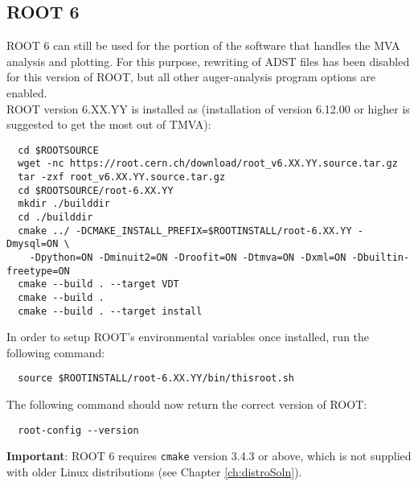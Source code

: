 \documentclass[12pt,a4paper]{report}
\begin{document}
\subsection{ROOT 6}
ROOT 6 can still be used for the portion of the software that handles the MVA analysis and plotting. For this purpose, rewriting of ADST files has been disabled for this version of ROOT, but all other auger-analysis program options are enabled.\\
ROOT version 6.XX.YY is installed as (installation of version 6.12.00 or higher is suggested to get the most out of TMVA):
\footnotesize
\begin{verbatim}
  cd $ROOTSOURCE
  wget -nc https://root.cern.ch/download/root_v6.XX.YY.source.tar.gz
  tar -zxf root_v6.XX.YY.source.tar.gz
  cd $ROOTSOURCE/root-6.XX.YY
  mkdir ./builddir
  cd ./builddir
  cmake ../ -DCMAKE_INSTALL_PREFIX=$ROOTINSTALL/root-6.XX.YY -Dmysql=ON \
    -Dpython=ON -Dminuit2=ON -Droofit=ON -Dtmva=ON -Dxml=ON -Dbuiltin-freetype=ON
  cmake --build . --target VDT
  cmake --build .
  cmake --build . --target install
\end{verbatim}
\normalsize
In order to setup ROOT's environmental variables once installed, run the following command:
\footnotesize
\begin{verbatim}
  source $ROOTINSTALL/root-6.XX.YY/bin/thisroot.sh
\end{verbatim}
\normalsize
The following command should now return the correct version of ROOT:
\footnotesize
\begin{verbatim}
  root-config --version
\end{verbatim}
\normalsize
\textbf{Important}: ROOT 6 requires \texttt{cmake} version 3.4.3 or above, which is not supplied with older Linux distributions (see Chapter \ref{ch:distroSoln}).
\end{document}
